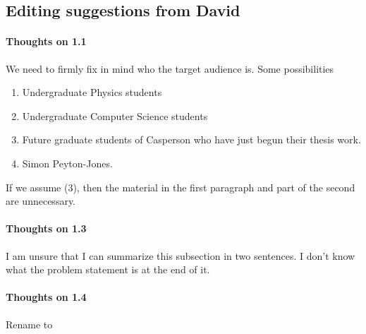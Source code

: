 \begin{enumerate}
\subsection{Editing suggestions from David}\label{sec:edit-sugg-david}

\paragraph{Thoughts on 1.1}

We need to firmly fix in mind who the target audience is.  Some
possibilities
\begin{enumerate}
\item Undergraduate Physics students
\item Undergraduate Computer Science students
\item
  Future graduate students of Casperson who have just begun their
  thesis work.
\item
  Simon Peyton-Jones.
\end{enumerate}
If we assume (3), then the material in the first paragraph and part of
the second are unnecessary.

\paragraph{Thoughts on 1.3}

I am unsure that I can summarize this subsection in two sentences.  I
don't know what the problem statement is at the end of it.

\paragraph{Thoughts on 1.4}

Rename to 


\end{enumerate}
